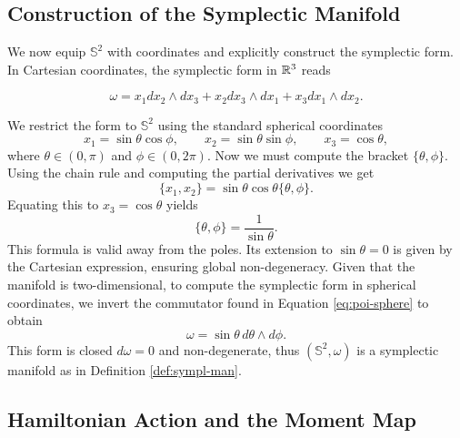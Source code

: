 	\subsection*{Construction of the Symplectic Manifold}
	We now equip $\mathbb{S}^2$ with coordinates and explicitly construct the symplectic form. In Cartesian coordinates, the symplectic form in $\mathbb{R}^3$ reads
	
	$$\omega =  x_1 dx_2 \wedge dx_3 + x_2 dx_3 \wedge dx_1 + x_3 dx_1 \wedge dx_2. $$
	
	\noindent We restrict the form to $\mathbb{S}^2$ using the standard spherical coordinates
	\[
	x_1 = \sin\theta \cos\phi, \qquad x_2 = \sin\theta \sin\phi, \qquad x_3 = \cos\theta,
	\]
	where \(\theta \in (0,\pi) \) and \(\phi \in (0, 2\pi)\). Now we must compute the bracket \(\{\theta, \phi\}\). Using the chain rule and computing the partial derivatives we get%
			\[
			\{x_1, x_2\} = \sin\theta \cos\theta \{\theta,\phi\}.
			\]
			Equating this to \(x_3 = \cos\theta\) yields
			\begin{equation}
				\boxed{\{\theta, \phi\} = \frac{1}{\sin\theta}.}\label{eq:poi-sphere}
			\end{equation}
			\noindent This formula is valid away from the poles. Its extension to \(\sin\theta=0\) is given by the Cartesian expression, ensuring global non-degeneracy.
			Given that the manifold is two-dimensional, to compute the symplectic form in spherical coordinates, we invert the commutator found in Equation \eqref{eq:poi-sphere} to obtain
			\begin{equation}
				\boxed{\omega = \sin\theta \, d\theta \wedge d\phi.} \label{eq:omega-sphere}
			\end{equation}
			\noindent This form is closed \(d\omega = 0\) and non-degenerate, thus \((\mathbb{S}^2, \omega)\) is a symplectic manifold as in Definition \ref{def:sympl-man}.
			
			\subsection*{Hamiltonian Action and the Moment Map}
			
